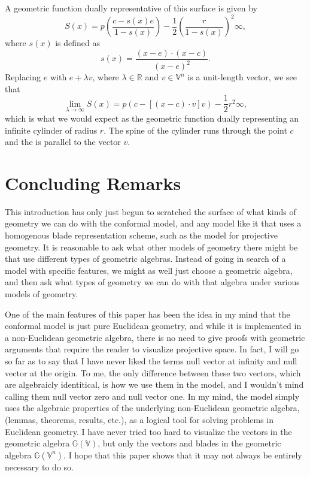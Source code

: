 \documentclass[12pt]{article}
\newcommand{\G}{\mathbb{G}}
\newcommand{\V}{\mathbb{V}}
\newcommand{\R}{\mathbb{R}}
\newcommand{\nvai}{\infty}
\begin{document}
A geometric function dually representative of this surface is given by
\begin{equation*}
S(x) = p\left(\frac{c-s(x)e}{1-s(x)}\right)-\frac{1}{2}\left(\frac{r}{1-s(x)}\right)^2\nvai,
\end{equation*}
where $s(x)$ is defined as
\begin{equation*}
s(x) = \frac{(x-e)\cdot(x-c)}{(x-e)^2}.
\end{equation*}
Replacing $e$ with $e+\lambda v$, where $\lambda\in\R$ and $v\in\V^n$ is a unit-length vector,
we see that
\begin{equation*}
\lim_{\lambda\to\infty} S(x) = p(c-[(x-c)\cdot v]v)-\frac{1}{2}r^2\nvai,
\end{equation*}
which is what we would expect as the geometric function dually representing an infinite cylinder
of radius $r$.  The spine of the cylinder runs through the point $c$ and the is parallel
to the vector $v$.



\section{Concluding Remarks}

This introduction has only just begun to scratched the surface of
what kinds of geometry we can do with the conformal model, and
any model like it that uses a homogenous blade representation scheme,
such as the model for projective geometry.  It is reasonable to ask
what other models of geometry there might be that use different
types of geometric algebras.  Instead of going in search of a model
with specific features, we might as well just choose a geometric algebra,
and then ask what types of geometry we can do with that algebra under
various models of geometry.

One of the main features of this paper has been the idea in my mind
that the conformal model is just pure Euclidean geometry, and while
it is implemented in a non-Euclidean geometric algebra, there is no
need to give proofs with geometric arguments that require the reader
to visualize projective space.  In fact, I will go so far as to say that
I have never liked the terms null vector at infinity and null vector at
the origin.  To me, the only difference between these two vectors, which are algebraicly identitical,
is how we use them in the model, and I wouldn't mind calling them null vector zero
and null vector one.  In my mind, the model simply uses the algebraic properties
of the underlying non-Euclidean geometric algebra, (lemmas, theorems, results, etc.), as a logical tool for
solving problems in Euclidean geometry.  I have never tried too hard to visualize the vectors in the geometric
algebra $\G(\V)$, but only the vectors and blades in the geometric algebra $\G(\V^n)$.
I hope that this paper shows that it may not always be entirely necessary to do so.
\end{document}
